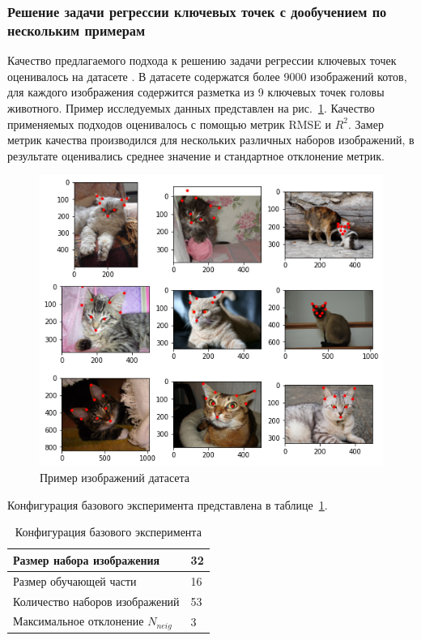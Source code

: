 \documentclass[a4paper,14pt]{article}
\begin{document}
    \subsubsection{Решение задачи регрессии ключевых точек с дообучением по нескольким примерам} \label{kpoints_exp}
     
    Качество предлагаемого подхода к решению задачи регрессии ключевых точек оценивалось на датасете \cite{cat_dataset}. 
    В датасете содержатся более 9000 изображений котов, для каждого изображения содержится разметка из 9 ключевых точек головы животного.
    Пример исследуемых данных представлен на рис.~\ref{fig:example_cat_dataset}.
    Качество применяемых подходов оценивалось с помощью метрик RMSE и $R^2$.
    Замер метрик качества производился для нескольких различных наборов изображений, в результате оценивались среднее значение и стандартное отклонение метрик.
    
    \begin{figure}[H]
    	\centering
    	\includegraphics[width=0.6\linewidth]{images/example_cat_dataset}
    	\caption{Пример изображений датасета \cite{cat_dataset}}
    	\label{fig:example_cat_dataset}
    \end{figure}
    
    Конфигурация базового эксперимента представлена в таблице~\ref{tab:base_config}.
    \begin{center}
    	\begin{table}[H]
    		\centering
    		\caption{Конфигурация базового эксперимента}
    		\label{tab:base_config}
    		\bgroup
    		\def\arraystretch{1.5}
    		\begin{tabular}{| l | l |}
    			\hline
    			Размер набора изображения & 32\\ \hline
    			Размер обучающей части & 16\\ \hline
    			Количество наборов изображений & 53\\ \hline
    			Максимальное отклонение  $N_{neig}$ & 3\\
    			\hline
    		\end{tabular}
    		\egroup
    	\end{table}
    \end{center}
    
\end{document}
